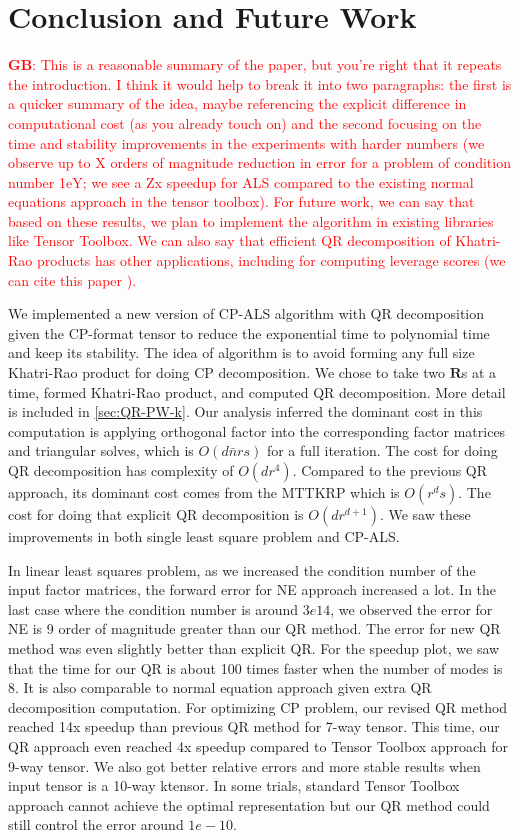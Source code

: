 \documentclass{article}
\newcommand{\mat}[1]{\mathbf{#1}}
\newcommand{\GB}[1]{\textcolor{red}{\textbf{GB}: #1}}
\begin{document}
\section{Conclusion and Future Work}

\GB{This is a reasonable summary of the paper, but you're right that it repeats the introduction.  I think it would help to break it into two paragraphs: the first is a quicker summary of the idea, maybe referencing the explicit difference in computational cost (as you already touch on) and the second focusing on the time and stability improvements in the experiments with harder numbers (we observe up to X orders of magnitude reduction in error for a problem of condition number 1eY; we see a Zx speedup for ALS compared to the existing normal equations approach in the tensor toolbox).  For future work, we can say that based on these results, we plan to implement the algorithm in existing libraries like Tensor Toolbox.  We can also say that efficient QR decomposition of Khatri-Rao products has other applications, including for computing leverage scores (we can cite this paper \cite{bharadwaj2023fast}).}


We implemented a new version of CP-ALS algorithm with QR decomposition given the CP-format tensor to reduce the exponential time to polynomial time and keep its stability.
The idea of algorithm is to avoid forming any full size Khatri-Rao product for doing CP decomposition. 
We chose to take two $\mat{R}$s at a time, formed Khatri-Rao product, and computed QR decomposition.
More detail is included in \cref{sec:QR-PW-k}.
Our analysis inferred the dominant cost in this computation is applying orthogonal factor into the corresponding factor matrices and triangular solves, which is $O(d \bar n rs)$ for a full iteration.
The cost for doing QR decomposition has complexity of $O(dr^4)$. Compared to the previous QR approach, its dominant cost comes from the MTTKRP which is $O(r^ds)$.
The cost for doing that explicit QR decomposition is $O(dr^{d+1})$.
We saw these improvements in both single least square problem and CP-ALS.

In linear least squares problem, as we increased the condition number of the input factor matrices, the forward error for NE approach increased a lot.
In the last case where the condition number is around $3e14$, we observed the error for NE is 9 order of magnitude greater than our QR method.
The error for new QR method was even slightly better than explicit QR.
For the speedup plot, we saw that the time for our QR is about 100 times faster when the number of modes is 8.
It is also comparable to normal equation approach given extra QR decomposition computation.
For optimizing CP problem, our revised QR method reached 14x speedup than previous QR method for 7-way tensor.
This time, our QR approach even reached 4x speedup compared to Tensor Toolbox approach for 9-way tensor.
We also got better relative errors and more stable results when input tensor is a 10-way ktensor.
In some trials, standard Tensor Toolbox approach cannot achieve the optimal representation but our QR method could still control the error around $1e-10$.
\end{document}
